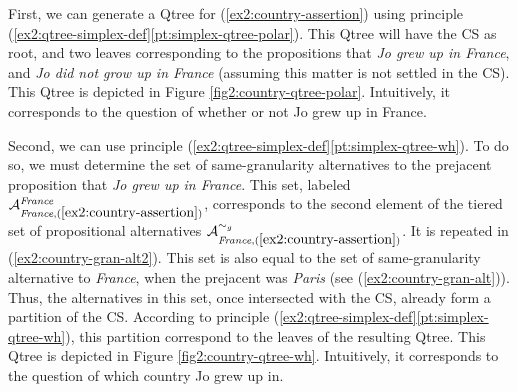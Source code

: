 \begin{exe}
	\label{ex2:country-tiered-alt}
\end{exe} 


First, we can generate a Qtree for (\ref{ex2:country-assertion}) using principle (\ref{ex2:qtree-simplex-def}\ref{pt:simplex-qtree-polar}). This Qtree will have the CS as root, and two leaves corresponding to the propositions that \textit{Jo grew up in France}, and \textit{Jo did not grow up in France} (assuming this matter is not settled in the CS). This Qtree is depicted in Figure \ref{fig2:country-qtree-polar}. Intuitively, it corresponds to the question of whether or not Jo grew up in France.

Second, we can use principle (\ref{ex2:qtree-simplex-def}\ref{pt:simplex-qtree-wh}). To do so, we must determine the set of same-granularity alternatives to the prejacent proposition that \textit{Jo grew up in France}. This set, labeled $\mathcal{A}_{\textit{France}, (\ref{ex2:country-assertion})}^{\textit{France}}$, corresponds to the second element of the tiered set of propositional alternatives $\mathcal{A}_{\textit{France}, (\ref{ex2:country-assertion})}^{\sim_g}$. It is repeated in (\ref{ex2:country-gran-alt2}). This set is also equal to the set of same-granularity alternative to \textit{France}, when the prejacent was \textit{Paris} (see (\ref{ex2:country-gran-alt})). Thus, the alternatives in this set, once intersected with the CS, already form a partition of the CS. According to principle (\ref{ex2:qtree-simplex-def}\ref{pt:simplex-qtree-wh}), this partition correspond to the leaves of the resulting Qtree. This Qtree is depicted in Figure \ref{fig2:country-qtree-wh}. Intuitively, it corresponds to the question of which country Jo grew up in.


